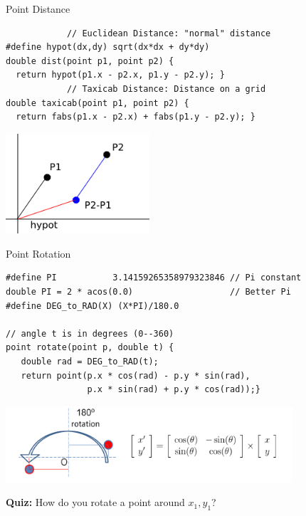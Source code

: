 \begin{frame}[fragile]{Point Distance}
    \begin{exampleblock}{}
\begin{verbatim}
            // Euclidean Distance: "normal" distance
#define hypot(dx,dy) sqrt(dx*dx + dy*dy)
double dist(point p1, point p2) {
  return hypot(p1.x - p2.x, p1.y - p2.y); }
            // Taxicab Distance: Distance on a grid
double taxicab(point p1, point p2) {
  return fabs(p1.x - p2.x) + fabs(p1.y - p2.y); }
\end{verbatim}
    \end{exampleblock}

    \begin{center}
      \includegraphics[width=0.4\textwidth]{../img/geom1}
    \end{center}
\end{frame}

\begin{frame}[fragile]{Point Rotation}

  {\smaller

    \begin{exampleblock}{}
\begin{verbatim}
#define PI           3.14159265358979323846 // Pi constant
double PI = 2 * acos(0.0)                   // Better Pi
#define DEG_to_RAD(X) (X*PI)/180.0

// angle t is in degrees (0--360)
point rotate(point p, double t) {
   double rad = DEG_to_RAD(t);
   return point(p.x * cos(rad) - p.y * sin(rad),
                p.x * sin(rad) + p.y * cos(rad));}
\end{verbatim}
    \end{exampleblock}
    \begin{center}
      \includegraphics[width=0.8\textwidth]{../img/rotation_halim}
    \end{center}
}
    {\bf Quiz:} How do you rotate a point around $x_1, y_1$?
\end{frame}

